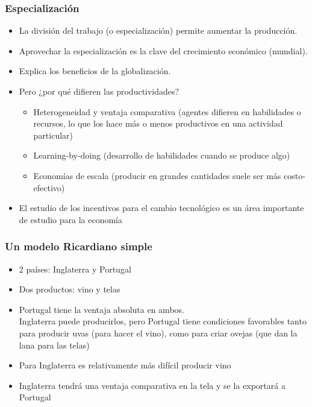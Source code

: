 \documentclass{beamer}
\begin{document}
\begin{frame}
    \frametitle{Especialización}
    \begin{itemize}
        \item La división del trabajo (o especialización) permite aumentar la producción.
        \item Aprovechar la especialización es la clave del crecimiento económico (mundial).
        \item  Explica los beneficios de la globalización.
    \item Pero ¿por qué difieren las productividades?

        \begin{itemize}\vspace{2mm}
            \item Heterogeneidad y ventaja comparativa (agentes difieren en habilidades o recursos, lo que los hace más o menos productivos en una actividad particular)
            \item Learning-by-doing (desarrollo de habilidades cuando se produce algo) \vspace{2mm}
            \item Economías de escala (producir en grandes cantidades suele ser más costo-efectivo) \vspace{2mm}
        
        \end{itemize}
            \item El estudio de los incentivos para el cambio tecnológico es un área importante de estudio para la economía
    \end{itemize} 
\end{frame}

\begin{frame}
    \frametitle{Un modelo Ricardiano simple}
    \begin{itemize}
        \item 2 países: Inglaterra y Portugal\vspace{2mm}
        \item Dos productos: vino y telas\vspace{2mm}
        \item Portugal tiene la ventaja absoluta en ambos. \\
        Inglaterra puede producirlos, pero Portugal tiene condiciones favorables tanto para producir uvas (para hacer el vino), como para criar ovejas (que dan la lana para las telas)\vspace{2mm}
        \item Para Inglaterra es relativamente más difícil producir vino\vspace{2mm}
        \item Inglaterra tendrá una ventaja comparativa en la tela y se la exportará a Portugal
    \end{itemize} 
\end{frame}
\end{document}
